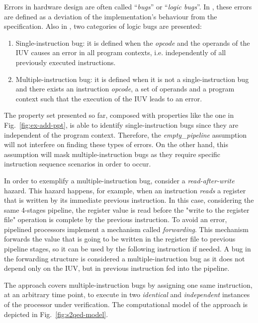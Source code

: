 Errors in hardware design are often called “\textit{bugs}” or “\textit{logic bugs}”. In \cite{paper-gapfree}, these errors are defined as a deviation of the implementation’s behaviour from the specification. Also in \cite{paper-gapfree}, two categories of logic bugs are presented:

\begin{enumerate}
\item Single-instruction bug: it is defined when the \textit{opcode} and the operands of the IUV causes an error in all program contexts, i.e. independently of all previously executed instructions.
\item Multiple-instruction bug: it is defined when it is not a single-instruction bug and there exists an instruction \textit{opcode}, a set of operands and a program context such that the execution of the IUV leads to an error.
\end{enumerate}

The property set presented so far, composed with properties like the one in Fig.~\ref{fig:ex-add-ppt}, is able to identify single-instruction bugs since they are independent of the program context. Therefore, the \textit{empty\_pipeline} assumption will not interfere on finding these types of errors. On the other hand, this assumption will mask multiple-instruction bugs as they require specific instruction sequence scenarios in order to occur.

In order to exemplify a multiple-instruction bug, consider a \textit{read-after-write} hazard. This hazard happens, for example, when an instruction \textit{reads} a register that is written by its immediate previous instruction. In this case, considering the same 4-stages pipeline, the register value is read before the "write to the register file" operation is complete by the previous instruction. To avoid an error, pipelined processors implement a mechanism called \textit{forwarding}. This mechanism forwards the value that is going to be written in the register file to previous pipeline stages, so it can be used by the following instruction if needed. A bug in the forwarding structure is considered a multiple-instruction bug as it does not depend only on the IUV, but in previous instruction fed into the pipeline. 

The \SSQED{} approach covers multiple-instruction bugs by assigning one same instruction, at an arbitrary time point, to execute in two \textit{identical} and \textit{independent} instances of the processor under verification. The computational model of the \SSQED{} approach is depicted in Fig.~\ref{fig:s2qed-model}.

